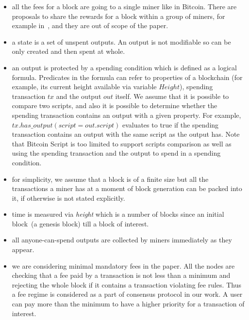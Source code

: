\documentclass[]{llncs}   %
\begin{document}
\begin{itemize}
  \item{} all the fees for a block are going to a single miner like in Bitcoin.
      There are proposals to share the rewards for a block within a group of
      miners, for example in~\cite{eyal2016bitcoin,kogias2016enhancing}, and
      they are out of scope of the paper.
  \item{} a state is a set of unspent outputs. An output is not modifiable so
      can be only created and then spent at whole. 
  \item{} an output is protected by a spending condition which is defined as a
      logical formula. Predicates in the formula can refer to properties of a
      blockchain (for example, its current height available via variable
      $Height$), spending transaction $tx$ and the output $out$ itself. We
      assume that it is possible to compare two scripts, and also it is possible
      to determine whether the spending transaction contains an output with a
      given property. For example, $tx.has\_output(script = out.script)$
      evaluates to true if the spending transaction contains an output with the
      same script as the output has. Note that Bitcoin Script is too limited to
      support scripts comparison as well as using the spending transaction and
      the output to spend in a spending condition.
  \item{} for simplicity, we assume that a block is of a finite size but all the
      transactions a miner has at a moment of block generation can be packed
      into it, if otherwise is not stated explicitly.
  \item{} time is measured via \textit{height} which is a number of blocks since
      an initial block~(a genesis block) till a block of interest. 
  \item{} all anyone-can-spend outputs are collected by miners immediately as
      they appear.
  \item{} we are considering minimal mandatory fees in the paper. All the nodes
      are checking that a fee paid by a transaction is not less than a minimum
      and rejecting the whole block if it contains a transaction violating fee
      rules. Thus a fee regime is considered as a part of consensus protocol in
      our work. A user can pay more than the minimum to have a higher priority
      for a transaction of interest.   
\end{itemize}
\end{document}
